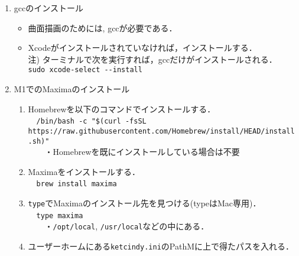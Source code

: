 \documentclass{ujarticle}
\begin{document}
\begin{enumerate}[\bf\large 1.]
\item gccのインストール
  \begin{itemize}
    \item 曲面描画のためには, gccが必要である．
    \item Xcodeがインストールされていなければ，インストールする．\\
    \hspace*{5mm}注) ターミナルで次を実行すれば，gccだけがインストールされる．\\
    \hspace*{20mm}\verb|sudo xcode-select --install|
  \end{itemize}


\item M1でのMaximaのインストール
  \begin{enumerate}[(1)]
    \item Homebrewを以下のコマンドでインストールする．\\
　{\small \verb|/bin/bash -c "$(curl -fsSL https://raw.githubusercontent.com/Homebrew/install/HEAD/install.sh)"|}\\
　　・Homebrewを既にインストールしている場合は不要
\item Maximaをインストールする．\\
　\verb|brew install maxima|
\item \verb|type|でMaximaのインストール先を見つける(typeはMac専用)．\\
　\verb|type maxima|\\
　　・\verb|/opt/local|, \verb|/usr/local|などの中にある．
\item ユーザーホームにある\verb|ketcindy.ini|のPathMに上で得たパスを入れる．
  \end{enumerate}


\end{enumerate}
\end{document}
